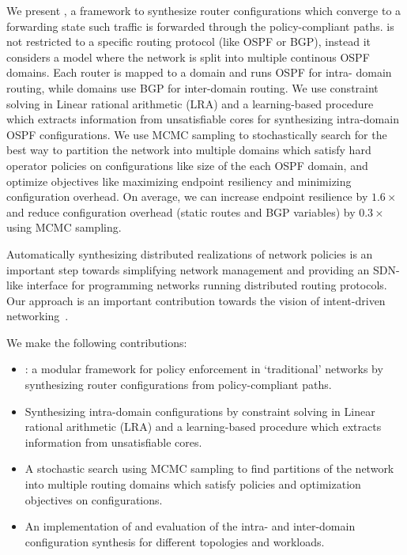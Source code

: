 We present \name, 
a framework to synthesize router configurations which 
converge to a forwarding state such traffic is
forwarded through the policy-compliant paths. 
\name is not restricted to a specific routing protocol (like 
OSPF or BGP), instead it considers a model where 
the network is split into multiple continous OSPF domains.
Each router is mapped to a domain and runs OSPF for intra-
domain routing, while domains use BGP for inter-domain
routing. We use constraint solving in Linear rational 
arithmetic (LRA) and a learning-based procedure which 
extracts information from unsatisfiable cores 
for synthesizing intra-domain OSPF configurations. 
We use MCMC sampling to stochastically search for 
the best way to partition the network into multiple 
domains which satisfy hard operator policies on configurations
like size of the each OSPF domain, and optimize objectives like 
maximizing endpoint resiliency and minimizing configuration 
overhead. On average, we can increase endpoint resilience
by $1.6\times$ and reduce configuration overhead (static routes
and BGP variables) by $0.3\times$ using MCMC sampling. 


Automatically synthesizing distributed realizations 
of network policies is an
important step towards simplifying 
network management and providing an 
SDN-like interface for programming networks 
running distributed routing protocols. 
Our approach is an important
contribution towards the vision of 
intent-driven networking~\cite{intent}.


 We make the following contributions:
\begin{itemize}
	\item \name: a modular framework 
	for policy enforcement in `traditional' networks
	by synthesizing router configurations from policy-compliant paths. 
	\item Synthesizing intra-domain configurations by
	constraint solving in Linear rational arithmetic (LRA) and 
	a learning-based procedure which extracts information from 
	unsatisfiable cores. 
	\item A stochastic search using MCMC sampling to find 
	partitions of the network into multiple routing domains which
	satisfy policies and optimization objectives on configurations.
	\item An implementation of \name and evaluation of the 
	intra- and inter-domain configuration synthesis for different
	topologies and workloads. 
\end{itemize}
